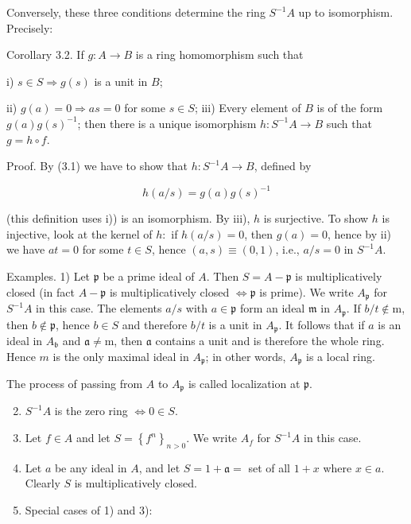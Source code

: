\documentclass{standalone}
\theoremstyle{definition}
\theoremstyle{remark}
\begin{document}
Conversely, these three conditions determine the ring $S^{-1} A$ up to isomorphism. Precisely:

Corollary 3.2. If $g: A \rightarrow B$ is a ring homomorphism such that

i) $s \in S \Rightarrow g(s)$ is a unit in $B$;

ii) $g(a)=0 \Rightarrow a s=0$ for some $s \in S$; iii) Every element of $B$ is of the form $g(a) g(s)^{-1}$; then there is a unique isomorphism $h: S^{-1} A \rightarrow B$ such that $g=h \circ f$.

Proof. By (3.1) we have to show that $h: S^{-1} A \rightarrow B$, defined by

\[
h(a / s)=g(a) g(s)^{-1}
\]

(this definition uses i)) is an isomorphism. By iii), $h$ is surjective. To show $h$ is injective, look at the kernel of $h:$ if $h(a / s)=0$, then $g(a)=0$, hence by ii) we have $a t=0$ for some $t \in S$, hence $(a, s) \equiv(0,1)$, i.e., $a / s=0$ in $S^{-1} A$.

Examples. 1) Let $\mathfrak{p}$ be a prime ideal of $A$. Then $S=A-\mathfrak{p}$ is multiplicatively closed (in fact $A-\mathfrak{p}$ is multiplicatively closed $\Leftrightarrow \mathfrak{p}$ is prime). We write $A_{\mathfrak{p}}$ for $S^{-1} A$ in this case. The elements $a / s$ with $a \in \mathfrak{p}$ form an ideal $\mathfrak{m}$ in $A_{\mathfrak{p}}$. If $b / t \notin \mathrm{m}$, then $b \notin \mathfrak{p}$, hence $b \in S$ and therefore $b / t$ is a unit in $A_{\mathfrak{p}}$. It follows that if $a$ is an ideal in $A_{\mathfrak{b}}$ and $\mathfrak{a} \neq \mathrm{m}$, then $\mathfrak{a}$ contains a unit and is therefore the whole ring. Hence $m$ is the only maximal ideal in $A_{\mathfrak{p}}$; in other words, $A_{\mathfrak{p}}$ is a local ring.

The process of passing from $A$ to $A_{\mathfrak{p}}$ is called localization at $\mathfrak{p}$.

\begin{enumerate}
  \setcounter{enumi}{1}
  \item $S^{-1} A$ is the zero ring $\Leftrightarrow 0 \in S$.

  \item Let $f \in A$ and let $S=\left\{f^{n}\right\}_{n>0}$. We write $A_{f}$ for $S^{-1} A$ in this case.

  \item Let $a$ be any ideal in $A$, and let $S=1+\mathfrak{a}=$ set of all $1+x$ where $x \in a$. Clearly $S$ is multiplicatively closed.

  \item Special cases of 1) and 3):

\end{enumerate}
\end{document}
